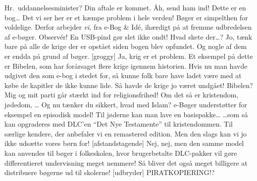 \documentclass[a4paper,11pt]{article}
\begin{document}
\begin{sketch}

     Hr.\ uddannelsesminister? Din aftale er kommet.
     Åh, send ham ind!
     Dette er en bog\ldots
     Det vi ser her er et kæmpe problem i hele verden! Bøger er simpelthen
             for voldelige. Derfor arbejder \emph{vi}, fra e-Bog \& Idé, ihærdigt på
             at fremme udbredelsen af e-bøger. Observér!
     En USB-pind gør slet ikke ondt!
     Hvad skete der\ldots? 
     Jo, tænk bare på alle de krige der er opstået siden bogen blev opfundet.
             Og nogle af dem er endda på grund af bøger.
    [groggy] Ja, krig er et problem.
     Et eksempel på dette er Bibelen, som har forårsaget flere krige igennem
             historien. Hvis nu man havde udgivet den som
             e-bog i stedet for, så kunne folk bare have ladet være med at købe de
             kapitler de ikke kunne lide. Så havde de krige jo været undgået!
     Bibelen? Mig og mit parti går stærkt ind for religionsfrihed! Om det så er
             kristendom, jødedom, \ldots
     Og nu tænker du sikkert, hvad med Islam?
             e-Bøger understøtter for eksempel en episodisk model!
             Til jøderne kan man lave en basispakke\ldots {}
             \ldots som så kan opgraderes med DLC'en ``Det Nye Testamente'' til kristendommen. 
             Til særlige kendere, der anbefaler vi en remastered edition.
     Men den slags kan vi jo ikke udsætte vores børn for!
    [afstandstagende] Nej, nej, men den samme model kan anvendes til bøger i folkeskolen,
             hvor brugerbetalte DLC-pakker vil gøre differentieret undervisning meget nemmere!
     Så bliver det også meget billigere at distribuere bøgerne ud til skolerne!
    [udbryder] PIRATKOPIERING!?

\end{sketch}
\end{document}

